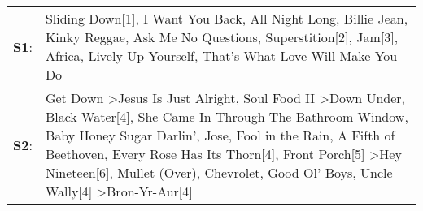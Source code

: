 \begin{supertabular}{p{0.03\textwidth}p{0.92\textwidth}}
 \textbf{S1}:  &                                                                                                                                                                                                                                                                                                                                                                                        Sliding Down[1]\textsuperscript{}, \enspace I Want You Back\textsuperscript{}, \enspace All Night Long\textsuperscript{}, \enspace Billie Jean\textsuperscript{}, \enspace Kinky Reggae\textsuperscript{}, \enspace Ask Me No Questions\textsuperscript{}, \enspace Superstition[2]\textsuperscript{}, \enspace Jam[3]\textsuperscript{}, \enspace Africa\textsuperscript{}, \enspace Lively Up Yourself\textsuperscript{}, \enspace That's What Love Will Make You Do\textsuperscript{}  \enspace  \\
 \textbf{S2}:  &  Get Down\textsuperscript{} \textgreater \enspace Jesus Is Just Alright\textsuperscript{}, \enspace Soul Food II\textsuperscript{} \textgreater \enspace Down Under\textsuperscript{}, \enspace Black Water[4]\textsuperscript{}, \enspace She Came In Through The Bathroom Window\textsuperscript{}, \enspace Baby Honey Sugar Darlin'\textsuperscript{}, \enspace Jose\textsuperscript{}, \enspace Fool in the Rain\textsuperscript{}, \enspace A Fifth of Beethoven\textsuperscript{}, \enspace Every Rose Has Its Thorn[4]\textsuperscript{}, \enspace Front Porch[5]\textsuperscript{} \textgreater \enspace Hey Nineteen[6]\textsuperscript{}, \enspace Mullet (Over)\textsuperscript{}, \enspace Chevrolet\textsuperscript{}, \enspace Good Ol' Boys\textsuperscript{}, \enspace Uncle Wally[4]\textsuperscript{} \textgreater \enspace Bron-Yr-Aur[4]\textsuperscript{}  \enspace  \\
\end{supertabular}
